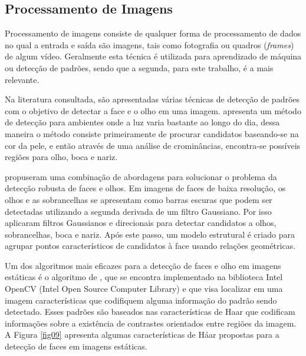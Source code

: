 \begin{anexosenv}
\subsection[Processamento de Imagens]{Processamento de Imagens}

Processamento de imagens consiste de qualquer forma de processamento de dados no qual a entrada e saída são imagens, tais como fotografia ou quadros (\textit{frames}) de algum vídeo. Geralmente esta técnica é utilizada para aprendizado de máquina ou detecção de padrões, sendo que a segunda, para este trabalho, é a mais relevante.

Na literatura consultada, são apresentadas várias técnicas de detecção de padrões com o objetivo de detectar a face e o olho em uma imagem.  apresenta um método de detecção para ambientes onde a luz varia bastante ao longo do dia, dessa maneira o método consiste primeiramente de procurar candidatos baseando-se na cor da pele, e então através de uma análise de crominâncias, encontra-se possíveis regiões para olho, boca e nariz. 

 propuseram uma combinação de abordagens para solucionar o problema da detecção robusta de faces e olhos. Em imagens de faces de baixa resolução, os olhos e as sobrancelhas se apresentam como barras escuras que podem ser detectadas utilizando a segunda derivada de um filtro Gaussiano. Por isso aplicaram filtros Gaussianos e direcionais para detectar candidatos a olhos, sobrancelhas, boca e nariz. Após este passo, um modelo estrutural é criado para agrupar pontos característicos de candidatos à face usando relações geométricas.

Um dos algoritmos mais eficazes para a detecção de faces e olho em imagens estáticas é o algoritmo de , que se encontra implementado na biblioteca Intel OpenCV (Intel Open Source Computer Library) e que visa localizar em uma imagem características que codifiquem alguma informação do padrão sendo detectado. Esses padrões são baseados nas características de Haar que codificam informações sobre a existência de contrastes orientados entre regiões da imagem. A Figura \ref{fig09} apresenta algumas características de Háar propostas para a detecção de faces em imagens estáticas.  



\end{anexosenv}
